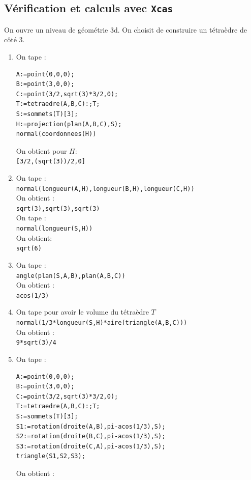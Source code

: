 \documentclass[a4paper,11pt]{book}
\begin{document}
\subsection{V\'erification et calculs avec {\tt Xcas}}
On ouvre un niveau de g\'eom\'etrie 3d. On choisit de construire un 
t\'etra\`edre de c\^ot\'e $3$.
 \begin{enumerate}
\item On tape :\\
\begin{verbatim}
A:=point(0,0,0);
B:=point(3,0,0);
C:=point(3/2,sqrt(3)*3/2,0);
T:=tetraedre(A,B,C):;T;
S:=sommets(T)[3];
H:=projection(plan(A,B,C),S);
normal(coordonnees(H))
\end{verbatim}
On obtient pour $H$:\\
{\tt [3/2,(sqrt(3))/2,0]}
\item On tape :\\
{\tt normal(longueur(A,H),longueur(B,H),longueur(C,H))}\\
On obtient :\\
{\tt sqrt(3),sqrt(3),sqrt(3)}\\
On tape :\\
{\tt  normal(longueur(S,H))}\\
On obtient:\\
{\tt sqrt(6)}
\item On tape :\\
{\tt angle(plan(S,A,B),plan(A,B,C))}\\
On obtient :\\
{\tt acos(1/3)}
\item On tape pour avoir le volume du t\'etra\`edre $T$\\
{\tt normal(1/3*longueur(S,H)*aire(triangle(A,B,C)))}\\
On obtient :\\
{\tt 9*sqrt(3)/4}
\item On tape :\\
\begin{verbatim}
A:=point(0,0,0);
B:=point(3,0,0);
C:=point(3/2,sqrt(3)*3/2,0);
T:=tetraedre(A,B,C):;T;
S:=sommets(T)[3];
S1:=rotation(droite(A,B),pi-acos(1/3),S);
S2:=rotation(droite(B,C),pi-acos(1/3),S);
S3:=rotation(droite(C,A),pi-acos(1/3),S);
triangle(S1,S2,S3);
\end{verbatim}
On obtient :\\

\end{enumerate}
\end{document}
